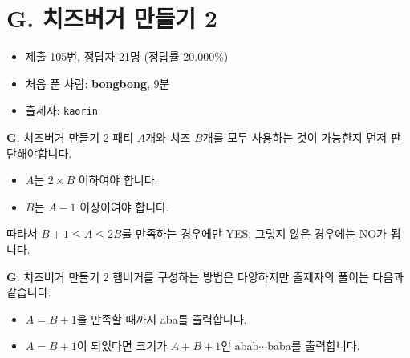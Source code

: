 \section{G. 치즈버거 만들기 2}

\begin{frame} %
    \begin{itemize}
        \item 제출 105번, 정답자 21명 (정답률 20.000\%)
        \item 처음 푼 사람: \textbf{bongbong}, 9분
        \item 출제자: \texttt{kaorin}
    \end{itemize}
\end{frame}

\begin{frame}{\textbf{G}. 치즈버거 만들기 2}
    패티 $A$개와 치즈 $B$개를 모두 사용하는 것이 가능한지 먼저 판단해야합니다.
    \vspace{16pt}
    \begin{itemize}
        \item $A$는 $2 \times B$ 이하여야 합니다.
        \item $B$는 $A-1$ 이상이여야 합니다.
    \end{itemize}%
    \vspace{16pt}
    따라서 $B+1 \leq A \leq 2B$를 만족하는 경우에만 YES, 그렇지 않은 경우에는 NO가 됩니다.
\end{frame}

\begin{frame}{\textbf{G}. 치즈버거 만들기 2}
    햄버거를 구성하는 방법은 다양하지만 출제자의 풀이는 다음과 같습니다.
    \vspace{16pt}
    \begin{itemize}
        \item $A=B+1$을 만족할 때까지 aba를 출력합니다.
        \item $A=B+1$이 되었다면 크기가 $A+B+1$인 abab$\cdots$baba를 출력합니다.
    \end{itemize}%
\end{frame}